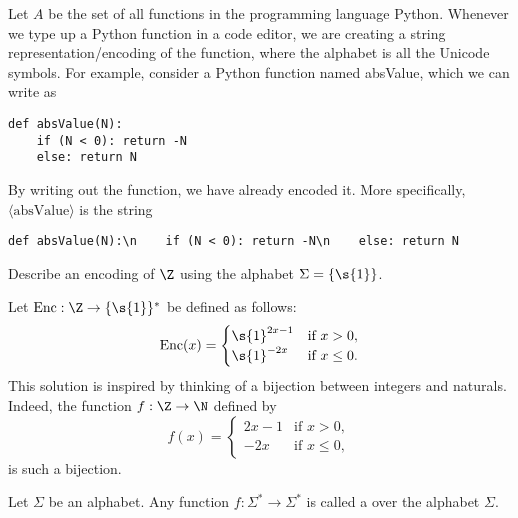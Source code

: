 \begin{example} \label{example:Encoding-of-Python-functions}
Let $A$ be the set of all functions in the programming language Python. Whenever we type up a Python function in a code editor, we are creating a string representation/encoding of the function, where the alphabet is all the Unicode symbols. For example, consider a Python function named absValue, which we can write as
\begin{verbatim}
def absValue(N):
    if (N < 0): return -N
    else: return N
\end{verbatim}
By writing out the function, we have already encoded it. More specifically, $\langle \text{absValue} \rangle$ is the string
\begin{verbatim}
def absValue(N):\n    if (N < 0): return -N\n    else: return N
\end{verbatim}
\end{example}

\begin{exercise} \label{exercise:Unary-encoding-of-integers}
Describe an encoding of $\Z$ using the alphabet $\Sigma = \{\s{1}\}$.
\end{exercise}

\begin{solution}
Let $\text{Enc}:\Z \to \{\s{1}\}^*$ be defined as follows:
\[
\text{Enc}(x) = 
\begin{cases}
\s{1}^{2x-1} & \text{if $x > 0$}, \\
\s{1}^{-2x}  & \text{if $x \leq 0$.}
\end{cases}
\]
This solution is inspired by thinking of a bijection between integers and naturals. Indeed, the function $f: \Z \to \N$ defined by  
\[
f(x) = 
\begin{cases}
2x-1 & \text{if $x > 0$}, \\
-2x  & \text{if $x \leq 0$,}
\end{cases}
\]
is such a bijection.
\end{solution}

\begin{definition} \label{definition:Computational-problem}
Let $\Sigma$ be an alphabet. Any function $f: \Sigma^* \to \Sigma^*$ is called a  over the alphabet $\Sigma$. 
\end{definition}

